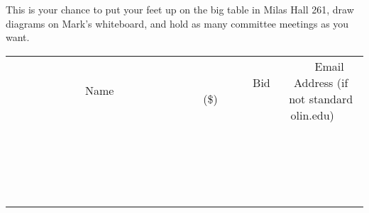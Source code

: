 \documentclass[11pt]{article}
\begin{document}
This is your chance to put your feet up on the big table in Milas Hall 261, draw diagrams on Mark's whiteboard, and hold as many committee meetings as you want.
\\[3ex]
\begin{tabular}{c c c}
~~~~~~~~~~~~~Name~~~~~~~~~~~~~ & ~~~~~~~~~Bid (\$)~~~~~~~~~  & ~~~Email Address (if not standard olin.edu)~~~\\
 & & \\
\hline
 & & \\
\hline
 & & \\
\hline
 & & \\
\hline
 & & \\
\hline
 & & \\
\hline
 & & \\
\hline
 & & \\
\hline
 & & \\
\hline
 & & \\
\hline
 & & \\
\hline
 & & \\
\hline
 & & \\
\hline
 & & \\
\hline
 & & \\
\hline
 & & \\
\hline
 & & \\
\hline
 & & \\
\hline
 & & \\
\hline
\end{tabular}
\newpage
\end{document}
